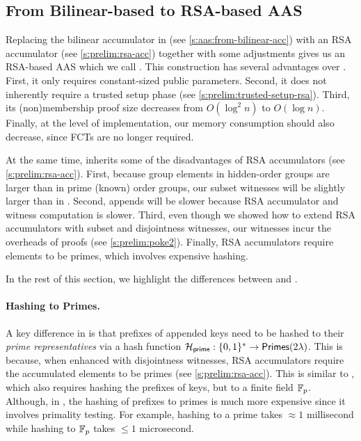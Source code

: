 \subsection{From Bilinear-based to RSA-based AAS}
\label{s:aas:from-rsa-acc:changes}

Replacing the bilinear accumulator in \biaas (see \cref{s:aas:from-bilinear-acc}) with an RSA accumulator (see \cref{s:prelim:rsa-acc}) together with some adjustments gives us an RSA-based AAS which we call \rsaaas.
This construction has several advantages over \biaas.
First, it only requires constant-sized public parameters.
Second, it does not inherently require a trusted setup phase (see \cref{s:prelim:trusted-setup-rsa}).
Third, its (non)membership proof size decreases from $O(\log^2{n})$ to $O(\log{n})$.
Finally, at the level of implementation, our memory consumption should also decrease, since FCTs are no longer required.

At the same time, \rsaaas inherits some of the disadvantages of RSA accumulators (see \cref{s:prelim:rsa-acc}).
First, because group elements in hidden-order groups are larger than in prime (known) order groups, our subset witnesses will be slightly larger than in \biaas.
Second, appends will be slower because RSA accumulator and witness computation is slower.
Third, even though we showed how to extend RSA accumulators with subset and disjointness witnesses, our witnesses incur the overheads of \poketwo proofs (see \cref{s:prelim:poke2}).
Finally, RSA accumulators require elements to be primes, which involves expensive hashing.

In the rest of this section, we highlight the differences between \biaas and \rsaaas.

\paragraph{Hashing to Primes.}
A key difference in \rsaaas is that prefixes of appended keys need to be hashed to their \textit{prime representatives} via a hash function $\mathcal{H}_{\mathsf{prime}} : \{0,1\}^* \rightarrow \mathsf{Primes}(2\lambda)$.
This is because, when enhanced with disjointness witnesses, RSA accumulators require the accumulated elements to be primes (see \cref{s:prelim:rsa-acc}).
This is similar to \biaas, which also requires hashing the prefixes of keys, but to a finite field $\mathbb{F}_p$.
Although, in \rsaaas, the hashing of prefixes to primes is much more expensive since it involves primality testing.
For example, hashing to a prime takes $\approx 1$ millisecond while hashing to $\mathbb{F}_p$ takes $\le 1$ microsecond.

